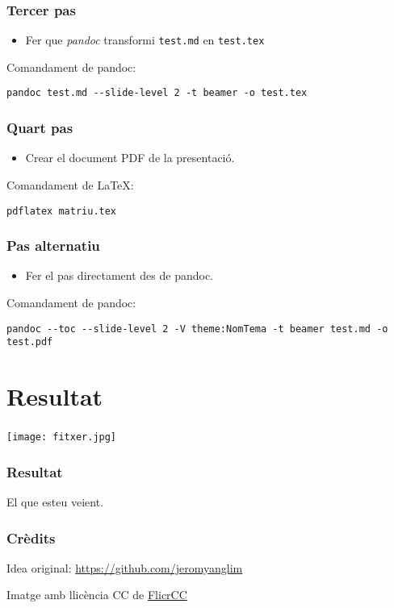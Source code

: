 \begin{frame}[fragile]\frametitle{Tercer pas}

\begin{itemize}
\item
  Fer que \emph{pandoc} transformi \texttt{test.md} en \texttt{test.tex}
\end{itemize}
Comandament de pandoc:

\texttt{pandoc test.md -{}-slide-level 2 -t beamer -o test.tex}

\end{frame}

\begin{frame}[fragile]\frametitle{Quart pas}

\begin{itemize}
\item
  Crear el document PDF de la presentació.
\end{itemize}
Comandament de LaTeX:

\texttt{pdflatex matriu.tex}

\end{frame}

\begin{frame}[fragile]\frametitle{Pas alternatiu}

\begin{itemize}
\item
  Fer el pas directament des de pandoc.
\end{itemize}
Comandament de pandoc:

\texttt{pandoc -{}-toc -{}-slide-level 2 -V theme:NomTema -t beamer test.md -o test.pdf}

\end{frame}

\section{Resultat}

\begin{frame}\frametitle{}

\centering\texttt{[image: fitxer.jpg]}

\end{frame}

\begin{frame}\frametitle{Resultat}

El que esteu veient.

\end{frame}

\begin{frame}[fragile]\frametitle{Crèdits}

Idea original: \url{https://github.com/jeromyanglim}

Imatge amb llicència CC de
\href{http://flickrcc.bluemountains.net/flickrCC/index.php}{FlicrCC}

\end{frame}
